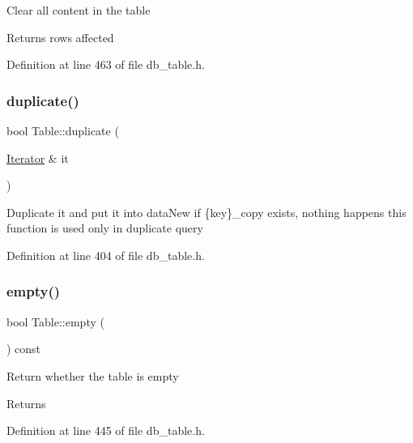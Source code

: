 Clear all content in the table \begin{DoxyReturn}{Returns}
rows affected 
\end{DoxyReturn}


Definition at line 463 of file db\+\_\+table.\+h.

\mbox{\label{class_table_aa7b2e954e0631acf5fbfe3e801eca1e3}} 
\subsubsection{\texorpdfstring{duplicate()}{duplicate()}}
{\footnotesize\ttfamily bool Table\+::duplicate (\begin{DoxyParamCaption}\item[{\hyperlink{class_table_1_1_iterator_impl}{Iterator} \&}]{it }\end{DoxyParamCaption})\hspace{0.3cm}{\ttfamily [inline]}}

Duplicate it and put it into data\+New if \{key\}\+\_\+copy exists, nothing happens this function is used only in duplicate query 

Definition at line 404 of file db\+\_\+table.\+h.

\mbox{\label{class_table_abb7690114d028b87e337540f42780cbb}} 
\subsubsection{\texorpdfstring{empty()}{empty()}}
{\footnotesize\ttfamily bool Table\+::empty (\begin{DoxyParamCaption}{ }\end{DoxyParamCaption}) const\hspace{0.3cm}{\ttfamily [inline]}}

Return whether the table is empty \begin{DoxyReturn}{Returns}

\end{DoxyReturn}


Definition at line 445 of file db\+\_\+table.\+h.

\mbox{\label{class_table_a5b5c1e536a44af329e2a9e35e469fde7}} 
